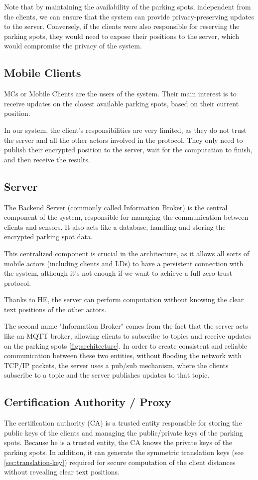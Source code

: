 Note that by maintaining the availability of the parking spots, independent from the clients, we can ensure that the system can provide privacy-preserving updates to the server. Conversely, if the clients were also responsible for reserving the parking spots, they would need to expose their positions to the server, which would compromise the privacy of the system.

\subsection{Mobile Clients}
MCs or Mobile Clients are the users of the system. Their main interest is to receive updates on the closest available parking spots, based on their current position. 

In our system, the client's responsibilities are very limited, as they do not trust the server and all the other actors involved in the protocol. They only need to publish their encrypted position to the server, wait for the computation to finish, and then receive the results.

\subsection{Server}
The Backend Server (commonly called Information Broker) is the central component of the system, responsible for managing the communication between clients and sensors. It also acts like a database, handling and storing the encrypted parking spot data.

This centralized component is crucial in the architecture, as it allows all sorts of mobile actors (including clients and LDs) to have a persistent connection with the system, although it's not enough if we want to achieve a full zero-trust protocol.

Thanks to HE, the server can perform computation without knowing the clear text positions of the other actors.

The second name "Information Broker" comes from the fact that the server acts like an MQTT broker, allowing clients to subscribe to topics and receive updates on the parking spots \cref{fig:architecture}. In order to create consistent and reliable communication between these two entities, without flooding the network with TCP/IP packets, the server uses a pub/sub mechanism, where the clients subscribe to a topic and the server publishes updates to that topic.

\subsection{Certification Authority / Proxy}
The certification authority (CA) is a trusted entity responsible for storing the public keys of the clients and managing the public/private keys of the parking spots. Because he is a trusted entity, the CA knows the private keys of the parking spots. In addition, it can generate the symmetric translation keys (see \cref{sec:translation-key}) required for secure computation of the client distances without revealing clear text positions.

